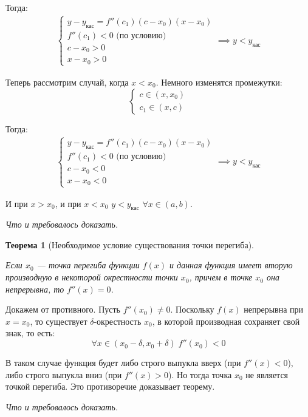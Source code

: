 \documentclass[a4paper,12pt,oneside]{extbook}
\newcommand{\newpar}{$ $\par\nobreak\ignorespaces}
\theoremstyle{numbered}
\theoremstyle{unnumbered}
\theoremstyle{named}
\newtheorem{theorem}{Теорема}[section]
\theoremstyle{unnumbered}
\theoremstyle{named}
\theoremstyle{named}
\theoremstyle{named}
\renewenvironment{proof}[1][]{\breakenv[Доказательство]{\if\relax\detokenize{#1}\relax\else\;\fi}{\textbf{#1}}}{\smallskip\newpar \hfill\textit{Что и требовалось доказать.}}
\begin{document}
\begin{proof}
    Тогда:
    \begin{gather*}
        \begin{cases}
            y - y_{\text{кас}} = f''(c_1)(c - x_0)(x - x_0) \\
            f''(c_1) < 0 \text{ (по условию)}               \\
            c - x_0 > 0                                     \\
            x - x_0 > 0
        \end{cases}
        \implies
        y < y_{\text{кас}}
    \end{gather*}

    Теперь рассмотрим случай, когда \(x < x_0\). Немного изменятся промежутки:
    \[
        \begin{cases}
            c \in (x, x_0) \\
            c_1 \in (x, c)
        \end{cases}
    \]

    Тогда:
    \begin{gather*}
        \begin{cases}
            y - y_{\text{кас}} = f''(c_1)(c - x_0)(x - x_0) \\
            f''(c_1) < 0 \text{ (по условию)}               \\
            c - x_0 < 0                                     \\
            x - x_0 < 0
        \end{cases}
        \implies
        y < y_{\text{кас}}
    \end{gather*}

    И при \(x > x_0\), и при \(x < x_0\) \(y < y_{\text{кас}}\) \(\forall x \in (a, b)\).
\end{proof}

\begin{theorem}[Необходимое условие существования точки перегиба]
    \newpar
    Если \(x_0\) — точка перегиба функции \(f(x)\) и данная функция имеет вторую производную в некоторой окрестности точки \(x_0\), причем в точке \(x_0\) она непрерывна, то \(f''(x) = 0\).
\end{theorem}

\begin{proof}
    Докажем от противного. Пусть \(f''(x_0) \neq 0\). Поскольку \(f(x)\) непрерывна при \(x = x_0\), то существует \(\delta\)-окрестность \(x_0\), в которой производная сохраняет свой знак, то есть:
    \[
        \forall x \in (x_0 - \delta, x_0 + \delta) \; f''(x_0) < 0
    \]

    В таком случае функция будет либо строго выпукла вверх (при \(f''(x) < 0\)), либо строго выпукла вниз (при \(f''(x) > 0\)). Но тогда точка \(x_0\) не является точкой перегиба. Это противоречие доказывает теорему.
\end{proof}
\end{document}
